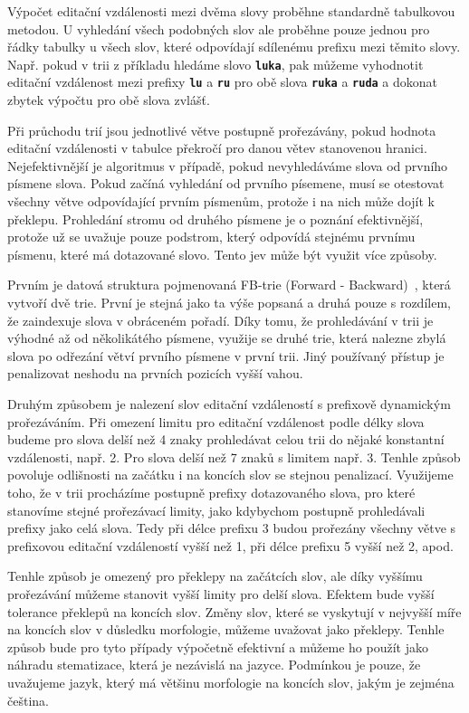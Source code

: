 \documentclass[11pt,letterpaper,oneside,openright]{book}
\newcommand{\bftt}[1]{\texttt{\textbf{#1}}}
\begin{document}
Výpočet editační vzdálenosti mezi dvěma slovy proběhne standardně tabulkovou
metodou. U vyhledání všech podobných slov ale proběhne pouze jednou pro řádky
tabulky u všech slov, které odpovídají sdílenému prefixu mezi těmito slovy.
Např. pokud v trii z příkladu hledáme slovo \bftt{luka}, pak můžeme vyhodnotit
editační vzdálenost mezi prefixy \bftt{lu} a \bftt{ru} pro obě slova
\bftt{ruka} a \bftt{ruda} a dokonat zbytek výpočtu pro obě slova zvlášť.

Při průchodu trií jsou jednotlivé větve postupně prořezávány, pokud hodnota
editační vzdálenosti v tabulce překročí pro danou větev stanovenou hranici.
Nejefektivnější je algoritmus v případě, pokud nevyhledáváme slova od prvního
písmene slova. Pokud začíná vyhledání od prvního písemene, musí se otestovat
všechny větve odpovídající prvním písmenům, protože i na nich může dojít k
překlepu. Prohledání stromu od druhého písmene je o poznání efektivnější,
protože už se uvažuje pouze podstrom, který odpovídá stejnému prvnímu písmenu,
které má dotazované slovo. Tento jev může být využit více způsoby. 

Prvním je datová struktura pojmenovaná FB-trie (Forward -
Backward)~\cite{Boytsov:2011:IMA:1963190.1963191}, která vytvoří dvě trie.
První je stejná jako ta výše popsaná a druhá pouze s rozdílem, že zaindexuje
slova v obráceném pořadí. Díky tomu, že prohledávání v trii je výhodné až od
několikátého písmene, využije se druhé trie, která nalezne zbylá slova po
odřezání větví prvního písmene v první trii. Jiný používaný přístup je
penalizovat neshodu na prvních pozicích vyšší vahou.

Druhým způsobem je nalezení slov editační vzdáleností s prefixově dynamickým
prořezáváním. Při omezení limitu pro editační vzdálenost podle délky slova
budeme pro slova delší než 4 znaky prohledávat celou trii do nějaké konstantní
vzdálenosti, např. 2. Pro slova delší než 7 znaků s limitem např. 3. Tenhle
způsob povoluje odlišnosti na začátku i na koncích slov se stejnou penalizací.
Využijeme toho, že v trii procházíme postupně prefixy dotazovaného slova, pro
které stanovíme stejné prořezávací limity, jako kdybychom postupně prohledávali
prefixy jako celá slova. Tedy při délce prefixu 3 budou prořezány všechny větve
s prefixovou editační vzdáleností vyšší než 1, při délce prefixu 5 vyšší než 2,
apod.

Tenhle způsob je omezený pro překlepy na začátcích slov, ale díky vyššímu
prořezávání můžeme stanovit vyšší limity pro delší slova. Efektem bude vyšší
tolerance překlepů na koncích slov. Změny slov, které se vyskytují v nejvyšší
míře na koncích slov v důsledku morfologie, můžeme uvažovat jako překlepy.
Tenhle způsob bude pro tyto případy výpočetně efektivní a můžeme ho použít jako
náhradu stematizace, která je nezávislá na jazyce. Podmínkou je pouze, že
uvažujeme jazyk, který má většinu morfologie na koncích slov, jakým je zejména
čeština.
\end{document}
